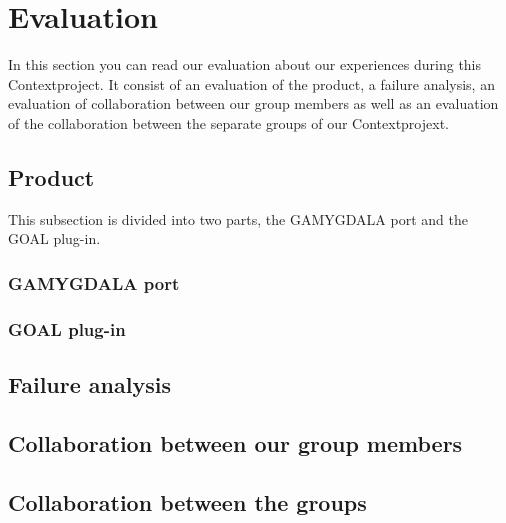 \section{Evaluation}
In this section you can read our evaluation about our experiences during this Contextproject. It consist of an evaluation of the product, a failure analysis, an evaluation of collaboration between our group members as well as an evaluation of the collaboration between the separate groups of our Contextprojext.

\subsection{Product}
This subsection is divided into two parts, the GAMYGDALA port and the GOAL plug-in.
\subsubsection{GAMYGDALA port}
\subsubsection{GOAL plug-in}

\subsection{Failure analysis}

\subsection{Collaboration between our group members}

\subsection{Collaboration between the groups}